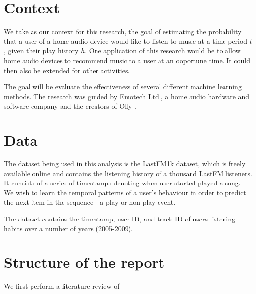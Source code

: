 \section{Context}

We take as our context for this research, the goal of estimating the probability that a user of a home-audio device would like to listen to music at a time period $t$, given their play history $h$. One application of this research would be to allow home audio devices to recommend music to a user at an ooportune time. It could then also be extended for other activities.

The goal will be evaluate the effectiveness of several different machine learning methods. The research was guided by Emotech Ltd., a home audio hardware and software company and the creators of Olly \parencite{Olly}.

\section{Data}

The dataset being used in this analysis is the LastFM1k dataset, which is freely available online and contains the listening history of a thousand LastFM listeners. It consists of a series of timestamps denoting when user started played a song. We wish to learn the temporal patterns of a user's behaviour in order to predict the next item in the sequence - a play or non-play event. 

The dataset contains the timestamp, user ID, and track ID of users listening habits over a number of years (2005-2009).

\section{Structure of the report}

We first perform a literature review of 
